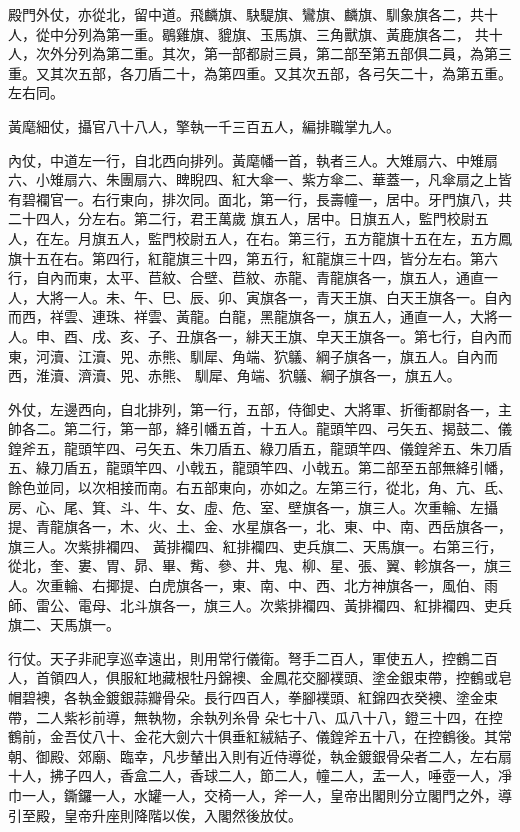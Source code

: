 \begin{pinyinscope}
 殿門外仗，亦從北，留中道。飛麟旗、駃騠旗、鸞旗、麟旗、馴象旗各二，共十人，從中分列為第一重。鶡雞旗、貔旗、玉馬旗、三角獸旗、黃鹿旗各二，
 共十人，次外分列為第二重。其次，第一部都尉三員，第二部至第五部俱二員，為第三重。又其次五部，各刀盾二十，為第四重。又其次五部，各弓矢二十，為第五重。左右同。



 黃麾細仗，攝官八十八人，擎執一千三百五人，編排職掌九人。



 內仗，中道左一行，自北西向排列。黃麾幡一首，執者三人。大雉扇六、中雉扇六、小雉扇六、朱團扇六、睥睨四、紅大傘一、紫方傘二、華蓋一，凡傘扇之上皆有碧襴官一。右行東向，排次同。面北，第一行，長壽幢一，居中。牙門旗八，共二十四人，分左右。第二行，君王萬歲
 旗五人，居中。日旗五人，監門校尉五人，在左。月旗五人，監門校尉五人，在右。第三行，五方龍旗十五在左，五方鳳旗十五在右。第四行，紅龍旗三十四，第五行，紅龍旗三十四，皆分左右。第六行，自內而東，太平、苣紋、合壁、苣紋、赤龍、青龍旗各一，旗五人，通直一人，大將一人。未、午、巳、辰、卯、寅旗各一，青天王旗、白天王旗各一。自內而西，祥雲、連珠、祥雲、黃龍。白龍，黑龍旗各一，旗五人，通直一人，大將一人。申、酉、戌、亥、子、丑旗各一，緋天王旗、皁天王旗各一。第七行，自內而東，河瀆、江瀆、兕、赤熊、馴犀、角端、狖鸃、綱子旗各一，旗五人。自內而西，淮瀆、濟瀆、兕、赤熊、
 馴犀、角端、狖鸃、綱子旗各一，旗五人。



 外仗，左邊西向，自北排列，第一行，五部，侍御史、大將軍、折衝都尉各一，主帥各二。第二行，第一部，絳引幡五首，十五人。龍頭竿四、弓矢五、揭鼓二、儀鍠斧五，龍頭竿四、弓矢五、朱刀盾五、綠刀盾五，龍頭竿四、儀鍠斧五、朱刀盾五、綠刀盾五，龍頭竿四、小戟五，龍頭竿四、小戟五。第二部至五部無絳引幡，餘色並同，以次相接而南。右五部東向，亦如之。左第三行，從北，角、亢、氐、房、心、尾、箕、斗、牛、女、虛、危、室、壁旗各一，旗三人。次重輪、左攝提、青龍旗各一，木、火、土、金、水星旗各一，北、東、中、南、西岳旗各一，旗三人。次紫排襴四、
 黃排襴四、紅排襴四、吏兵旗二、天馬旗一。右第三行，從北，奎、婁、胃、昴、畢、觜、參、井、鬼、柳、星、張、翼、軫旗各一，旗三人。次重輪、右揶提、白虎旗各一，東、南、中、西、北方神旗各一，風伯、雨師、雷公、電母、北斗旗各一，旗三人。次紫排襴四、黃排襴四、紅排襴四、吏兵旗二、天馬旗一。



 行仗。天子非祀享巡幸遠出，則用常行儀衛。弩手二百人，軍使五人，控鶴二百人，首領四人，俱服紅地藏根牡丹錦襖、金鳳花交腳襆頭、塗金銀束帶，控鶴或皂帽碧襖，各執金鍍銀蒜瓣骨朵。長行四百人，拳腳襆頭、紅錦四衣癸襖、塗金束帶，二人紫衫前導，無執物，余執列糸骨
 朵七十八、瓜八十八，鐙三十四，在控鶴前，金吾仗八十、金花大劍六十俱垂紅絨結子、儀鍠斧五十八，在控鶴後。其常朝、御殿、郊廟、臨幸，凡步輦出入則有近侍導從，執金鍍銀骨朵者二人，左右扇十人，拂子四人，香盒二人，香球二人，節二人，幢二人，盂一人，唾壺一人，凈巾一人，鐁鑼一人，水罐一人，交椅一人，斧一人，皇帝出閣則分立閣門之外，導引至殿，皇帝升座則降階以俟，入閣然後放仗。




\end{pinyinscope}
